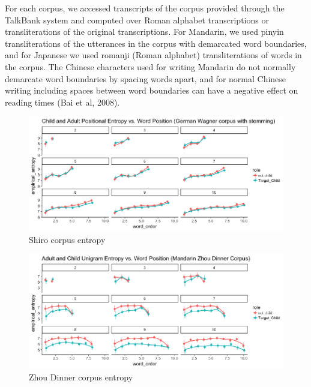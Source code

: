 \documentclass[10pt, letterpaper]{article}
\newenvironment{CodeChunk}{}{}
\begin{document}
For each corpus, we accessed transcripts of the corpus provided through
the TalkBank system and computed over Roman alphabet transcriptions or
transliterations of the original transcriptions. For Mandarin, we used
pinyin transliterations of the utterances in the corpus with demarcated
word boundaries, and for Japanese we used romanji (Roman alphabet)
transliterations of words in the corpus. The Chinese characters used for
writing Mandarin do not normally demarcate word boundaries by spacing
words apart, and for normal Chinese writing including spaces between
word boundaries can have a negative effect on reading times (Bai et al,
2008).

\begin{CodeChunk}
\begin{figure}[h]

{\centering \includegraphics{figs/shiro_PE-1} 

}

\caption[Shiro corpus entropy]{Shiro corpus entropy}\label{fig:shiro_PE}
\end{figure}
\end{CodeChunk}

\begin{CodeChunk}
\begin{figure}[h]

{\centering \includegraphics{figs/zhou_PE-1} 

}

\caption[Zhou Dinner corpus entropy]{Zhou Dinner corpus entropy}\label{fig:zhou_PE}
\end{figure}
\end{CodeChunk}
\end{document}
